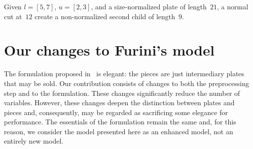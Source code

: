 \documentclass[smallextended]{svjour3}       %
\begin{document}



\begin{example}
Given \(l = [5, 7]\), \(u = [2, 3]\), and a size-normalized plate of length~\(21\), a normal cut at~\(12\) create a non-normalized second child of length~\(9\). %
\end{example}

\section{Our changes to Furini's model}
\label{sec:enhanced_model}


The formulation proposed in~\cite{furini:2016} is elegant: the pieces are just intermediary plates that may be sold.
Our contribution consists of changes to both the preprocessing step and to the formulation.
These changes significantly reduce the number of variables.
However, these changes deepen the distinction between plates and pieces and, consequently, may be regarded as sacrificing some elegance for performance.
The essentials of the formulation remain the same and, for this reason, we consider the model presented here as an enhanced model, not an entirely new model.
\end{document}

